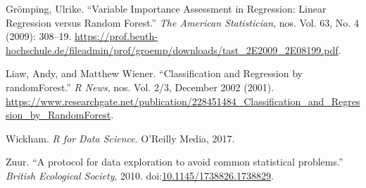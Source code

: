 \documentclass[a4paper, nobind]{templates/ociamthesis}
\newcommand*{\bibtitle}{Works Cited}
\begin{document}
\leavevmode\hypertarget{ref-Groemping2009}{}%
Grömping, Ulrike. ``Variable Importance Assessment in Regression: Linear Regression versus Random Forest.'' \emph{The American Statistician}, nos. Vol. 63, No. 4 (2009): 308--19. \url{https://prof.beuth-hochschule.de/fileadmin/prof/groemp/downloads/tast_2E2009_2E08199.pdf}.

\leavevmode\hypertarget{ref-Liaw2002}{}%
Liaw, Andy, and Matthew Wiener. ``Classification and Regression by randomForest.'' \emph{R News}, nos. Vol. 2/3, December 2002 (2001). \url{https://www.researchgate.net/publication/228451484_Classification_and_Regression_by_RandomForest}.

\leavevmode\hypertarget{ref-Hadley2017}{}%
Wickham. \emph{R for Data Science}. O'Reilly Media, 2017.

\leavevmode\hypertarget{ref-Zuur2010}{}%
Zuur. ``A protocol for data exploration to avoid common statistical problems.'' \emph{British Ecological Society}, 2010. doi:\href{https://doi.org/10.1145/1738826.1738829}{10.1145/1738826.1738829}.




\setlength{\baselineskip}{0pt} %

{\renewcommand*\MakeUppercase[1]{#1}%
\printbibliography[heading=bibintoc,title={\bibtitle}]}
\end{document}
